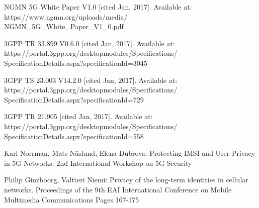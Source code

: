 \documentclass[12pt]{llncs}
\begin{document}
\begin{thebibliography}{4}

 NGMN 5G White Paper V1.0 [cited Jan, 2017]. Available at: https://www.ngmn.org/uploads/media/\\NGMN\_5G\_White\_Paper\_V1\_0.pdf

 3GPP TR 33.899 V0.6.0 [cited Jan, 2017]. Available at: https://portal.3gpp.org/desktopmodules/Specifications/\\SpecificationDetails.aspx?specificationId=3045

 3GPP TS 23.003 V14.2.0 [cited Jan, 2017]. Available at: https://portal.3gpp.org/desktopmodules/Specifications/\\SpecificationDetails.aspx?specificationId=729

 3GPP TR 21.905 [cited Jan, 2017]. Available at: https://portal.3gpp.org/desktopmodules/Specifications/\\SpecificationDetails.aspx?specificationId=558


 Karl Norrman, Mats N\"aslund, Elena Dubrova: Protecting IMSI and User Privacy in 5G Networks. 2nd International Workshop on 5G Security

 Philip Ginzboorg,  Valtteri Niemi: Privacy of the long-term identities in cellular networks. Proceedings of the 9th EAI International Conference on Mobile Multimedia Communications
Pages 167-175




\end{thebibliography}
\end{document}
